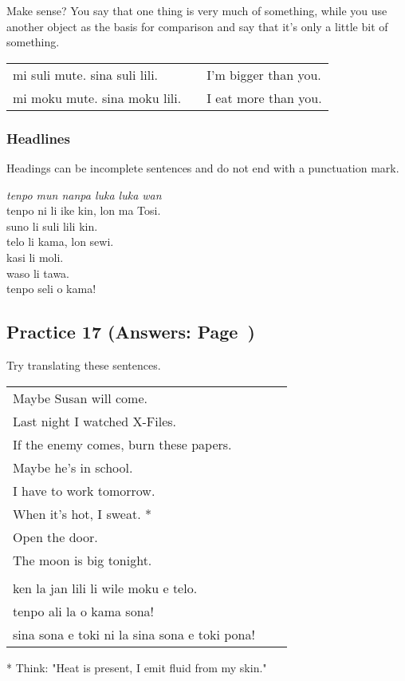Make sense? 
You say that one thing is very much of something, while you use another object as the basis for comparison and say that it's only a little bit of something. 

\begin{supertabular}{p{5,5cm}|ll}
mi suli mute. sina suli lili. && I'm bigger than you. \\
mi moku mute. sina moku lili. && I eat more than you. \\
\end{supertabular} 
%
\subsubsection*{Headlines} 
%
Headings can be incomplete sentences and do not end with a punctuation mark.

\textit{tenpo mun nanpa luka luka wan} \\
tenpo ni li ike kin, lon ma Tosi. \\
suno li suli lili kin. \\ 
telo li kama, lon sewi. \\
kasi li moli. \\
waso li tawa. \\
tenpo seli o kama! 

\newpage
\subsection*{Practice 17 (Answers: Page~\pageref{'la'})}
%
Try translating these sentences.

\begin{supertabular}{p{5,5cm}|ll}
   Maybe Susan will come.  && \\ %
   Last night I watched X-Files.  &&   \\ %
   If the enemy comes, burn these papers.  &&   \\ %
   Maybe he's in school.  &&   \\ %
   I have to work tomorrow.  &&   \\ %
   When it's hot, I sweat. *  &&  \\ %
   Open the door.   &&  \\ %
   The moon is big tonight.   &&  \\ %
 && \\ %
   ken la jan lili li wile moku e telo.  &&   \\ %
   tenpo ali la o kama sona!   &&  \\ %
   sina sona e toki ni la sina sona e toki pona!   &&  \\ %
\end{supertabular}

* Think: "Heat is present, I emit fluid from my skin."
